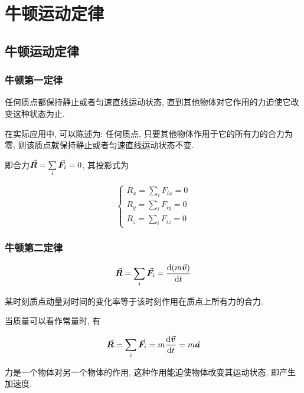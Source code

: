 \chapter{牛顿运动定律}

\begin{introduction}
	\item {}
	\item {}
	\item {}
	\item {}
\end{introduction}

\section{牛顿运动定律} \label{2.1}

\subsection{牛顿第一定律}

\begin{axiom}[牛顿第一定律] \label{C2-ax1}
	任何质点都保持静止或者匀速直线运动状态, 直到其他物体对它作用的力迫使它改变这种状态为止. 
\end{axiom}

在实际应用中, 可以陈述为: 任何质点, 只要其他物体作用于它的所有力的合力为零, 则该质点就保持静止或者匀速直线运动状态不变. 

即合力$\va*{R} = \sum\limits_i \va*{F}_i = 0$, 其投影式为

\begin{equation}
	\begin{cases}
		R_x = \sum\limits_i F_{ix} = 0 \\
		R_y = \sum\limits_i F_{iy} = 0 \\
		R_z = \sum\limits_i F_{iz} = 0 
	\end{cases}
    \label{C2-eq1}
\end{equation}

\subsection{牛顿第二定律}

\begin{axiom}[牛顿第二定律] \label{C2-ax2}
	
	\begin{equation}
		\va*{R} = \sum\limits_i \va*{F}_i = \dv{(m\va*{v})}{t}
		\label{C2-eq2}
	\end{equation}
	
	某时刻质点动量对时间的变化率等于该时刻作用在质点上所有力的合力. 
	
	当质量可以看作常量时, 有
	
	\begin{equation}
		\va*{R} = \sum\limits_i \va*{F}_i = m \dv{\va*{v}}{t} = m \va*{a}
		\label{C2-eq3}
	\end{equation}
	
	力是一个物体对另一个物体的作用, 这种作用能迫使物体改变其运动状态, 即产生加速度. 
	
\end{axiom}

